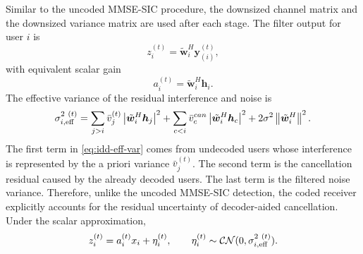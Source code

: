 Similar to the uncoded MMSE-SIC procedure, the downsized channel matrix and the downsized variance matrix are used after each stage. The filter output for user $i$ is
\begin{equation}
    z^{(t)}_{i}
    =
    \tilde{\bm{w}}^H_i
    \bm{y}_{(i)}^{(t)},
\end{equation}
with equivalent scalar gain
\begin{equation}
    a^{(t)}_{i}
    =
    \tilde{\bm{w}}^H_i\bm{h}_i .
\end{equation}
The effective variance of the residual interference and noise is
\begin{equation}
    \sigma_{i,\mathrm{eff}}^{2~(t)}
    =
    \sum_{j>i}
    \bar{v}_j^{(t)}
    \left\lvert \tilde{\bm{w}}^H_i\bm{h}_j \right\rvert^2
    +
    \sum_{c<i}
    \bar{v}_c^{can}
    \left\lvert \tilde{\bm{w}}^H_i\bm{h}_c \right\rvert^2
    +
    2\sigma^2\left\lVert \tilde{\bm{w}}^H_i \right\rVert^2 .
    \label{eq:idd-eff-var}
\end{equation}
The first term in \eqref{eq:idd-eff-var} comes from undecoded users whose interference is represented by the a priori variance $\bar{v}_j^{(t)}$. The second term is the cancellation residual caused by the already decoded users. The last term is the filtered noise variance. Therefore, unlike the uncoded MMSE-SIC detection, the coded receiver explicitly accounts for the residual uncertainty of decoder-aided cancellation.
Under the scalar approximation,
\begin{equation}
    z^{(t)}_{i}
    =
    a^{(t)}_{i}x_i
    +
    \eta^{(t)}_{i},
    \qquad
    \eta^{(t)}_{i}
    \sim
    \mathcal{CN}(0,\sigma_{i,\mathrm{eff}}^{2~(t)}).
\end{equation}

